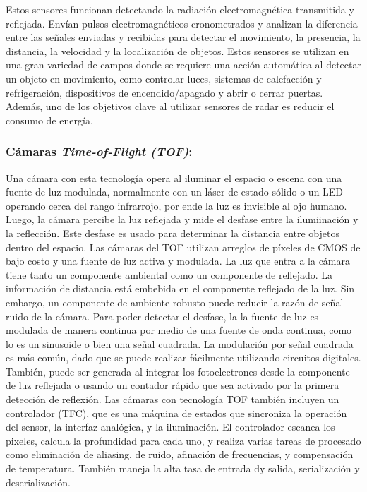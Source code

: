 Estos sensores funcionan detectando la radiación electromagnética transmitida y reflejada. Envían pulsos electromagnéticos cronometrados y analizan la diferencia entre las señales enviadas y recibidas para detectar el movimiento, la presencia, la distancia, la velocidad y la localización de objetos. Estos sensores se utilizan en una gran variedad de campos donde se requiere una acción automática al detectar un objeto en movimiento, como controlar luces, sistemas de calefacción y refrigeración, dispositivos de encendido/apagado y abrir o cerrar puertas. Además, uno de los objetivos clave al utilizar sensores de radar es reducir el consumo de energía. \cite{Ingle_2023} 

\subsubsection*{Cámaras \textit{Time-of-Flight (TOF)}:}

Una cámara con esta tecnología opera al iluminar el espacio o escena con una fuente de luz modulada, normalmente con un láser de estado sólido o un LED operando cerca del rango infrarrojo, por ende la luz es invisible al ojo humano. Luego, la cámara percibe la luz reflejada y mide el desfase entre la ilumiinación y la reflección. Este desfase es usado para determinar la distancia entre objetos dentro del espacio. Las cámaras del TOF utilizan arreglos de píxeles de CMOS de bajo costo y una fuente de luz activa y modulada. La luz que entra a la cámara tiene tanto un componente ambiental como un componente de reflejado. La información de distancia está embebida en el componente reflejado de la luz. Sin embargo, un componente de ambiente robusto puede reducir la razón de señal-ruido de la cámara. Para poder detectar el desfase, la la fuente de luz es modulada de manera continua por medio de una fuente de onda continua, como lo es un sinusoide o bien una señal cuadrada. La modulación por señal cuadrada es más común, dado que se puede realizar fácilmente utilizando circuitos digitales. También, puede ser generada al integrar los fotoelectrones desde la componente de luz reflejada o usando un contador rápido que sea activado por la primera detección de reflexión. Las cámaras con tecnología TOF también incluyen un controlador (TFC), que es una máquina de estados que sincroniza la operación del sensor, la interfaz analógica, y la iluminación. El controlador escanea los pixeles, calcula la profundidad para cada uno, y realiza varias tareas de procesado como eliminación de aliasing, de ruido, afinación de frecuencias, y compensación de temperatura. También maneja la alta tasa de entrada dy salida, serialización y deserialización. \cite{Li_2014}

